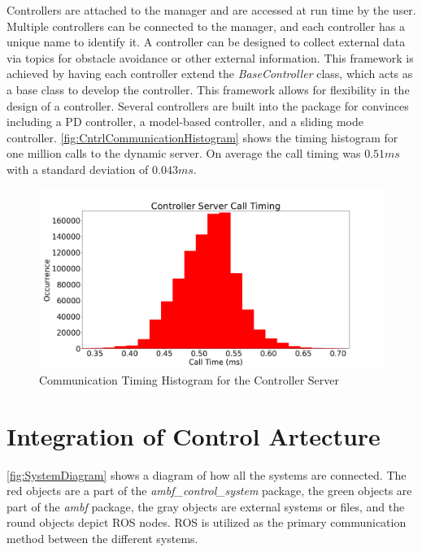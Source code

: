 Controllers are attached to the manager and are accessed at run time by the user. Multiple controllers can be connected to the manager, and each controller has a unique name to identify it.  A controller can be designed to collect external data via topics for obstacle avoidance or other external information. This framework is achieved by having each controller extend the \textit{BaseController} class, which acts as a base class to develop the controller. This framework allows for flexibility in the design of a controller. Several controllers are built into the package for convinces including a PD controller, a model-based controller, and a sliding mode controller.  \autoref{fig:CntrlCommunicationHistogram} shows the timing histogram for one million calls to the dynamic server. On average the call timing was $0.51ms$ with a standard deviation of $0.043ms$.  


 \begin{figure}
     \centering
     \includegraphics[scale=0.35]{images/software/control_loop_timing.png}
     \caption[Controller Server Timing Histogram]{Communication Timing Histogram for the Controller Server}
     \label{fig:CntrlCommunicationHistogram}
 \end{figure}


\section{Integration of Control Artecture}

\autoref{fig:SystemDiagram} shows a diagram of how all the systems are connected. The red objects are a part of the \textit{ambf\_control\_system} package, the green objects are part of the \textit{ambf} package, the gray objects are external systems or files, and the round objects depict ROS nodes. ROS is utilized as the primary communication method between the different systems.

